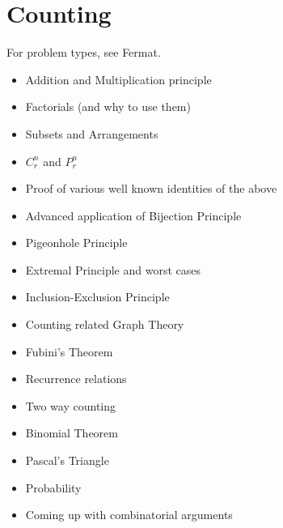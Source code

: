 \documentclass[oneside]{book}
\begin{document}
\vspace{10pt}

\section{Counting}
For problem types, see Fermat.
\begin{itemize}
    \item Addition and Multiplication principle
    \item Factorials (and why to use them)
    \item Subsets and Arrangements
    \item $C^{n}_r$ and $P^{n}_r$
    \item Proof of various well known identities of the above
    \item Advanced application of Bijection Principle
    \item Pigeonhole Principle
    \item Extremal Principle and worst cases
    \item Inclusion-Exclusion Principle
    \item Counting related Graph Theory
    \item Fubini's Theorem
    \item Recurrence relations
    \item Two way counting
    \item Binomial Theorem
    \item Pascal's Triangle
    \item Probability
    \item Coming up with combinatorial arguments
\end{itemize}
\newpage
\end{document}
